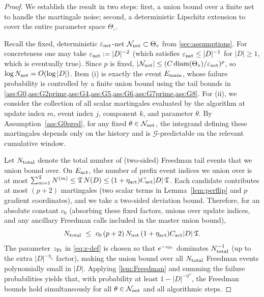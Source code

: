 \documentclass{statsoc}
\newcommand{\1}{\mathbbm{1}}
\newcommand{\Tmax}{\mathfrak{T}}
\begin{document}
\begin{proof}
We establish the result in two steps: first, a union bound over a finite net to handle the martingale noise; second, a deterministic Lipschitz extension to cover the entire parameter space $\Theta_\circ$.

Recall the fixed, deterministic $\varepsilon_{\rm net}$-net $\mathcal{N}_{\rm net} \subset \Theta_\circ$ from \cref{sec:assumptions}. For concreteness one may take $\varepsilon_{\rm net}:=|D|^{-2}$ (which satisfies $\varepsilon_{\rm net}\le |D|^{-1}$ for $|D|\ge 1$, which is eventually true). Since $p$ is fixed, $|\mathcal{N}_{\rm net}| \le (C \operatorname{diam}(\Theta_\circ)/\varepsilon_{\rm net})^p$, so $\log N_{\rm net} = O(\log |D|)$.
Item (i) is exactly the event $E_{\rm main}$, whose failure probability is controlled by a finite union bound using the
tail bounds in \cref{ass:G0,ass:G2prime,ass:G4,ass:G5,ass:G6,ass:G7prime,ass:G8}. For (ii), we consider the collection of all scalar martingales evaluated by the algorithm at update index \(m\), event index $j$, component $k$, and parameter $\theta$. By Assumption~\ref{ass:G0pred}, for any fixed $\theta \in \mathcal{N}_{\rm net}$, the integrand defining these martingales depends only on the history and is $\mathcal{G}$-predictable on the relevant cumulative window.

Let $N_{\rm total}$  denote the total number of (two-sided) Freedman tail events that we union bound over. On $E_{\rm act}$, the number of prefix event indices we union over is at most $\sum_{m=1}^{\Tmax}N^{(m)}\le \Tmax\,N(D)\le (1+\eta_{\rm act})C_{\rm act}|D|\,\Tmax$. Each candidate contributes at most $(p+2)$ martingales (two scalar terms in Lemma~\ref{lem:perflip} and $p$ gradient coordinates), and we take a two-sided deviation bound. Therefore, for an absolute constant $c_0$ (absorbing these fixed factors, unions over update indices, and any ancillary Freedman calls included in the master union bound),
\[
N_{\rm total}\ \le\ c_0\,(p+2)\,N_{\rm net}\,(1+\eta_{\rm act})C_{\rm act}|D|\,\Tmax.
\]
The parameter $z_{\rm Fr}$ in \eqref{eq:z-def} is chosen so that $e^{-z_{\rm Fr}}$ dominates $N_{\rm total}^{-1}$ (up to the extra $|D|^{-\eta_x}$ factor), making the union bound over all $N_{\rm total}$ Freedman events polynomially small in $|D|$. Applying \cref{lem:Freedman} and summing the failure probabilities yields that, with probability at least $1 - |D|^{-\eta''}$, the Freedman bounds hold simultaneously for all $\theta \in \mathcal{N}_{\rm net}$ and all algorithmic steps.


\end{proof}
\end{document}
